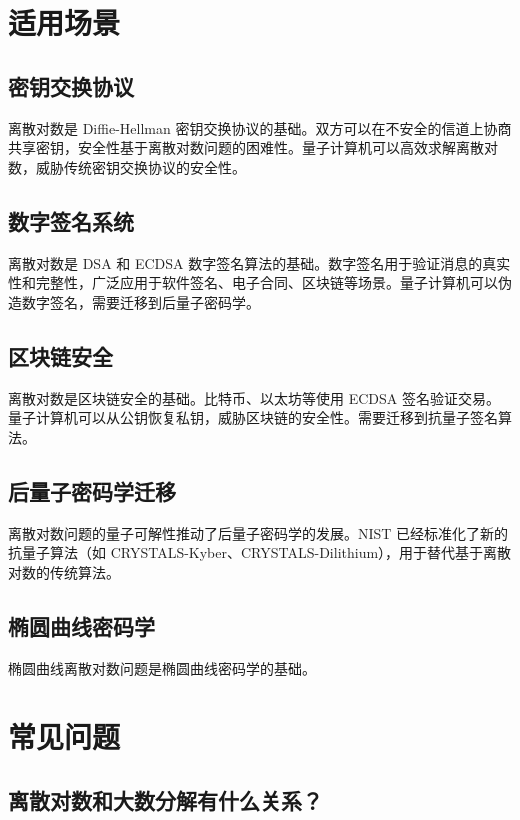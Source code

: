 \documentclass[12pt,a4paper]{article}
\begin{document}
\section{适用场景}

\subsection{密钥交换协议}

离散对数是 Diffie-Hellman 密钥交换协议的基础。双方可以在不安全的信道上协商共享密钥，安全性基于离散对数问题的困难性。量子计算机可以高效求解离散对数，威胁传统密钥交换协议的安全性。

\subsection{数字签名系统}

离散对数是 DSA 和 ECDSA 数字签名算法的基础。数字签名用于验证消息的真实性和完整性，广泛应用于软件签名、电子合同、区块链等场景。量子计算机可以伪造数字签名，需要迁移到后量子密码学。

\subsection{区块链安全}

离散对数是区块链安全的基础。比特币、以太坊等使用 ECDSA 签名验证交易。量子计算机可以从公钥恢复私钥，威胁区块链的安全性。需要迁移到抗量子签名算法。

\subsection{后量子密码学迁移}

离散对数问题的量子可解性推动了后量子密码学的发展。NIST 已经标准化了新的抗量子算法（如 CRYSTALS-Kyber、CRYSTALS-Dilithium），用于替代基于离散对数的传统算法。

\subsection{椭圆曲线密码学}

椭圆曲线离散对数问题是椭圆曲线密码学的基础。

\section{常见问题}

\subsection{离散对数和大数分解有什么关系？}
\end{document}
